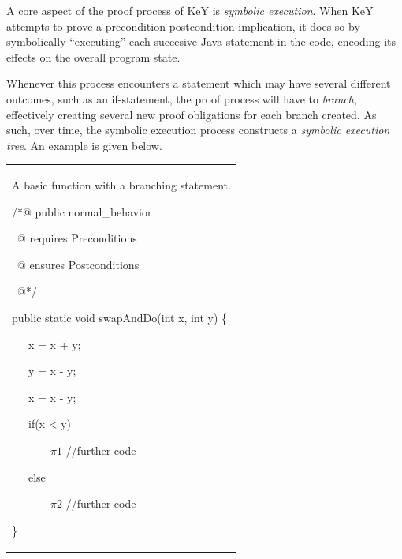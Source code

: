 \documentclass{article}
\newcommand{\tmem}[1]{{\em #1\/}}
\newenvironment{tmindent}{\begin{tmparmod}{1.5em}{0pt}{0pt} }{\end{tmparmod}}
\newenvironment{tmparmod}[3]{\begin{list}{}{\setlength{\topsep}{0pt}\setlength{\leftmargin}{#1}\setlength{\rightmargin}{#2}\setlength{\parindent}{#3}\setlength{\listparindent}{\parindent}\setlength{\itemindent}{\parindent}\setlength{\parsep}{\parskip}} \item[]}{\end{list}}
\newenvironment{tmparsep}[1]{\begingroup\setlength{\parskip}{#1}}{\endgroup}
\begin{document}
A core aspect of the proof process of KeY is {\tmem{symbolic execution}}. When
KeY attempts to prove a precondition-postcondition implication, it does so by
symbolically ``executing'' each succesive Java statement in the code, encoding
its effects on the overall program state.



Whenever this process encounters a statement which may have several different
outcomes, such as an if-statement, the proof process will have to
{\tmem{branch}}, effectively creating several new proof obligations for each
branch created. As such, over time, the symbolic execution process constructs
a {\tmem{symbolic execution tree}}. An example is given below.



\begin{tmparmod}{1cm}{0pt}{0pt}
  \begin{tmparmod}{0pt}{1cm}{0pt}
    {\noindent}{\noindent}\begin{tabular}{l}
      \begin{example}
        A basic function with a branching statement.
        
        {\noindent}\begin{tmindent}
          \begin{tmparsep}{0em}
            /*@ public normal\_behavior
            
            \ @ requires Preconditions
            
            \ @ ensures Postconditions
            
            \ @*/
            
            public static void swapAndDo(int x, int y) \{
            
            \ \ \ x = x + y;
            
            \ \ \ y = x - y;
            
            \ \ \ x = x - y;
            
            
            
            \ \ \ if(x < y)
            
            \ \ \ \ \ \ \ {\text{}}$\pi 1$ //further code
            
            \ \ \ else
            
            \ \ \ \ \ \ \ $\pi 2$ //further code
            
            \}
          \end{tmparsep}
        \end{tmindent}{\hspace*{\fill}}{\medskip}
      \end{example}
    \end{tabular}{\hspace*{\fill}}{\smallskip}
  \end{tmparmod}
\end{tmparmod}
\end{document}
